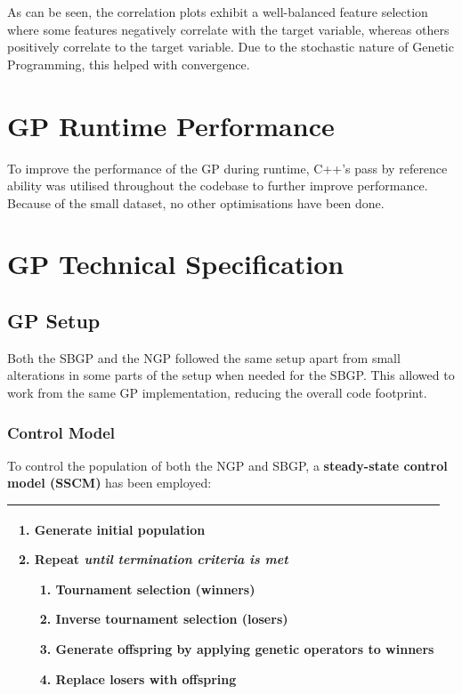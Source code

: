 \documentclass{article}
\begin{document}
As can be seen, the correlation plots exhibit a well-balanced feature selection where some features negatively correlate with the target variable, whereas others positively correlate to the target variable. Due to the stochastic nature of Genetic Programming, this helped with convergence.

\section{GP Runtime Performance}
To improve the performance of the GP during runtime, C++'s pass by reference ability was utilised throughout the codebase to further improve performance. Because of the small dataset, no other optimisations have been done.

\section{GP Technical Specification}
\subsection{GP Setup}
Both the SBGP and the NGP followed the same setup apart from small alterations in some parts of the setup when needed for the SBGP. This allowed to work from the same GP implementation, reducing the overall code footprint.
\subsubsection{Control Model}
\label{steadyState}
To control the population of both the NGP and SBGP, a \textbf{steady-state control model (SSCM)} has been employed:
\begin{table}[H]
\centering
\begin{tabularx}{\textwidth}{X}
\hline
\begin{enumerate}[label=\arabic*.]
  \item Generate initial population
  \item Repeat \emph{until termination criteria is met}
  \begin{enumerate}[label*=\arabic*.]
    \item Tournament selection (winners)
    \item Inverse tournament selection (losers)
    \item Generate offspring by applying genetic operators to winners
    \item Replace losers with offspring
  \end{enumerate}
\end{enumerate} \\
\hline
\end{tabularx}
\end{table}
\end{document}
